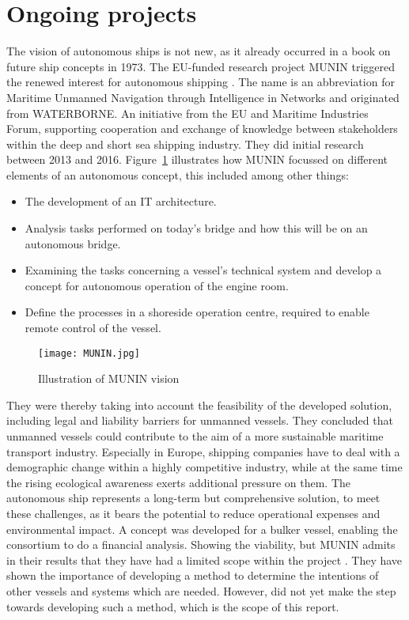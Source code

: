 \section{Ongoing projects}
The vision of autonomous ships is not new, as it already occurred in a book on future ship concepts in 1973. The EU-funded research project MUNIN triggered the renewed interest for autonomous shipping \cite{Saarni2018}. The name is an abbreviation for Maritime Unmanned Navigation through Intelligence in Networks and originated from WATERBORNE. An initiative from the EU and Maritime Industries Forum, supporting cooperation and exchange of knowledge between stakeholders within the deep and short sea shipping industry. They did initial research between 2013 and 2016. Figure~\ref{fig:MUNIN} illustrates how MUNIN focussed on different elements of an autonomous concept, this included among other things: 
\begin{itemize}
	\item The development of an IT architecture. 
	\item Analysis tasks performed on today's bridge and how this will be on an autonomous bridge. 
	\item Examining the tasks concerning a vessel’s technical system and develop a concept for autonomous operation of the engine room. 
	\item Define the processes in a shoreside operation centre, required to enable remote control of the vessel. 
\end{itemize}

\begin{figure}[hbp]
	\centering
	\texttt{[image: MUNIN.jpg]}
	\caption{Illustration of MUNIN vision}
	\label{fig:MUNIN}
\end{figure}

They were thereby taking into account the feasibility of the developed solution, including legal and liability barriers for unmanned vessels.
They concluded that unmanned vessels could contribute to the aim of a more sustainable maritime transport industry. Especially in Europe, shipping companies have to deal with a demographic change within a highly competitive industry, while at the same time the rising ecological awareness exerts additional pressure on them. The autonomous ship represents a long-term but comprehensive solution, to meet these challenges, as it bears the potential to reduce operational expenses and environmental impact.
A concept was developed for a bulker vessel, enabling the consortium to do a financial analysis. Showing the viability, but MUNIN admits in their results that they have had a limited scope within the project \cite{MUNIN2016}. They have shown the importance of developing a method to determine the intentions of other vessels and systems which are needed. However, did not yet make the step towards developing such a method, which is the scope of this report.

